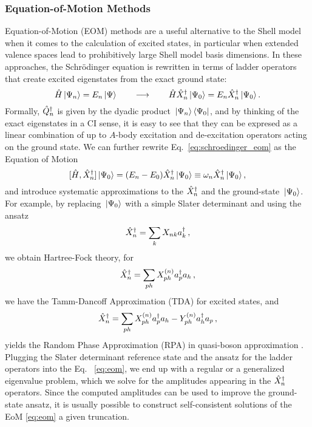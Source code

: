 %
%
\subsubsection{Equation-of-Motion Methods}

Equation-of-Motion (EOM) methods \cite{Rowe:1968eq} are a useful alternative
to the Shell model when it comes to the calculation of excited states,
in particular when extended valence spaces lead to prohibitively large
Shell model basis dimensions. In these approaches, the Schr\"odinger
equation is rewritten in terms of ladder operators
that create excited eigenstates from the exact ground state:
\begin{equation}\label{eq:schroedinger_eom}
  \HO\ket{\Psi_n} = E_n\ket{\Psi} \qquad\longrightarrow\qquad \HO\XXO_n\ket{\Psi_0} = E_n\XXO_n\ket{\Psi_0}\,.
\end{equation}
Formally, $\hat{Q}^\dag_n$ is given by the dyadic product $\,|{\Psi_n}\rangle\bra{\Psi_0}$,
and by thinking of the exact eigenstates in a CI sense, it is easy to see that 
they can be expresed as a linear combination of up to $A$-body excitation and 
de-excitation operators acting on the ground state. We can further rewrite
Eq.~\eqref{eq:schroedinger_eom} as the Equation of Motion
\begin{equation}\label{eq:eom}
  \comm{\HO}{\XXO_n}\ket{\Psi_0} = (E_n-E_0)\XXO_n\ket{\Psi_0} \equiv \omega_n \XXO_n\ket{\Psi_0}\,,
\end{equation}
and introduce systematic approximations to the $\hat{X}^\dag_n$ and the ground-state 
$\,|{\Psi_0}\rangle$. For example, by replacing $\,|{\Psi_0}\rangle$ with a simple Slater 
determinant and using the ansatz 
\begin{equation}
  \hat{X}^\dag_n = \sum_k X_{nk}a^\dag_k\,, 
\end{equation}
we obtain Hartree-Fock theory, for
\begin{equation}
  \hat{X}^\dag_n = \sum_{ph} X^{(n)}_{ph}a^\dag_pa_h\,, 
\end{equation}
we have the Tamm-Dancoff Approximation (TDA) for excited states, and
\begin{equation}\label{eq:rpa_ladder}
  \XXO_n = \sum_{ph} X^{(n)}_{ph}\aaO_p\aO_h - Y^{(n)}_{ph}\aaO_h\aO_p\,, 
\end{equation}
yields the Random Phase Approximation (RPA) in quasi-boson approximation
\cite{Ring:1980bb,Suhonen:2007wo}. Plugging the Slater determinant reference
state and the ansatz for the ladder operators into the Eq.~ 
\eqref{eq:eom}, we end up with a regular or a generalized eigenvalue problem, 
which we solve for the amplitudes appearing in the $\hat{X}^\dag_n$ operators. Since 
the computed amplitudes can be used to improve the ground-state ansatz, it is
usually possible to construct self-consistent solutions of the EoM \eqref{eq:eom}
a given truncation.

